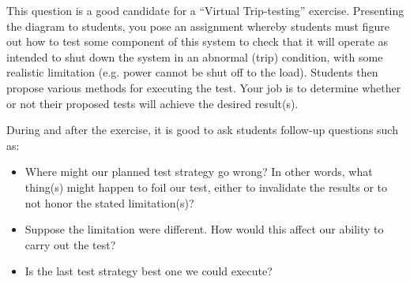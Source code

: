 This question is a good candidate for a ``Virtual Trip-testing'' exercise.  Presenting the diagram to students, you pose an assignment whereby students must figure out how to test some component of this system to check that it will operate as intended to shut down the system in an abnormal (trip) condition, with some realistic limitation (e.g. power cannot be shut off to the load).  Students then propose various methods for executing the test.  Your job is to determine whether or not their proposed tests will achieve the desired result(s).

During and after the exercise, it is good to ask students follow-up questions such as:

\begin{itemize}
\item{} Where might our planned test strategy go wrong?  In other words, what thing(s) might happen to foil our test, either to invalidate the results or to not honor the stated limitation(s)?
\item{} Suppose the limitation were different.  How would this affect our ability to carry out the test?
\item{} Is the last test strategy best one we could execute?
\end{itemize}






